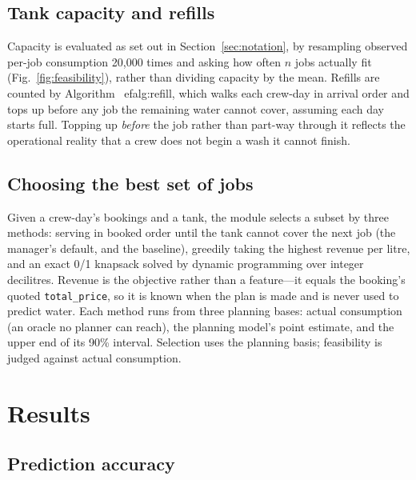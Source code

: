 \documentclass[conference]{IEEEtran}
\begin{document}
\subsection{Tank capacity and refills}
Capacity is evaluated as set out in Section~\ref{sec:notation}, by resampling observed per-job consumption 20,000 times and asking how
often $n$ jobs actually fit (Fig.~\ref{fig:feasibility}), rather than dividing capacity by the mean. Refills are counted by Algorithm~
ef{alg:refill}, which walks each crew-day in arrival order
and tops up before any job the remaining water cannot cover, assuming each day starts full.
Topping up \emph{before} the job rather than part-way through it reflects the operational
reality that a crew does not begin a wash it cannot finish.

\subsection{Choosing the best set of jobs}
Given a crew-day's bookings and a tank, the module selects a subset by three methods: serving in
booked order until the tank cannot cover the next job (the manager's default, and the baseline),
greedily taking the highest revenue per litre, and an exact 0/1 knapsack solved by dynamic
programming over integer decilitres. Revenue is the objective rather than a feature---it equals
the booking's quoted \texttt{total\_price}, so it is known when the plan is made and is never
used to predict water. Each method runs from three planning bases: actual consumption (an oracle
no planner can reach), the planning model's point estimate, and the upper end of its 90\%
interval. Selection uses the planning basis; feasibility is judged against actual consumption.

\section{Results}

\subsection{Prediction accuracy}
\label{sec:accuracy}
\end{document}
